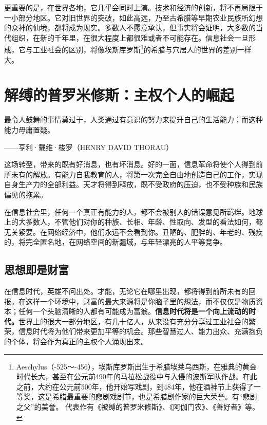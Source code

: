 更重要的是，在世界各地，它几乎会同时上演。技术和经济的创新，将不再局限于一小部分地区。它对旧世界的突破，如此高远，乃至古希腊等早期农业民族所幻想的众神的仙境，都将成为现实。多数人不愿意承认，但事实将会证明，大多数的当代组织，在新的千年里，在很大程度上都很难或者不可能存在。信息社会一旦形成，它与工业社会的区别，将像埃斯库罗斯\footnote{Aeschylus（-525～-456），埃斯库罗斯出生于希腊埃莱乌西斯，在雅典的黄金时代长大，甚至在公元前490年的马拉松战役中与入侵的波斯军队作战。在此之前，大约在公元前500年，他开始写戏剧，到484年，他在酒神节上获得了一等奖，这是希腊最重要的悲剧戏剧节，也是希腊剧作家的巨大荣誉。有“悲剧之父”的美誉。 代表作有《被缚的普罗米修斯》、《阿伽门农》、《善好者》等。}的希腊与穴居人的世界的差别一样大。

\section{解缚的普罗米修斯：主权个人的崛起}

\begin{tcolorbox}
最令人鼓舞的事情莫过于，人类通过有意识的努力来提升自己的生活能力；而这种能力毋庸置疑。
\begin{flushright}
——亨利·戴维·梭罗（HENRY DAVID THORAU）
\end{flushright}
\end{tcolorbox}

这场转型，带来的既有好消息，也有坏消息。好的一面，信息革命将使个人得到前所未有的解放。有能力自我教育的人，将第一次完全自由地创造自己的工作，实现自身生产力的全部利益。天才将得到释放，既不受政府的压迫，也不受种族和民族偏见的拖累。


在信息社会里，任何一个真正有能力的人，都不会被别人的错误意见所羁绊。地球上的大多数人，不管他们对你的种族、长相、年龄、性取向、发型的看法如何，都无关紧要。在网络经济中，他们永远不会看到你。丑陋的、肥胖的、年老的、残疾的，将完全匿名地，在网络空间的新疆域，与年轻漂亮的人平等竞争。

\subsection{思想即是财富}

在信息时代，英雄不问出处。才能，无论它在哪里出现，都将得到前所未有的回报。在这样一个环境中，财富的最大来源将是你脑子里的想法，而不仅仅是物质资本；任何一个头脑清晰的人都有可能成为富翁。\textbf{信息时代将是一个向上流动的时代。}世界上的很大一部分地区，有几十亿人，从来没有充分分享过工业社会的繁荣，信息时代将为他们带来更加平等的机会。那些智慧过人、能力出众、充满抱负的个体，将会作为真正的主权个人涌现出来。


